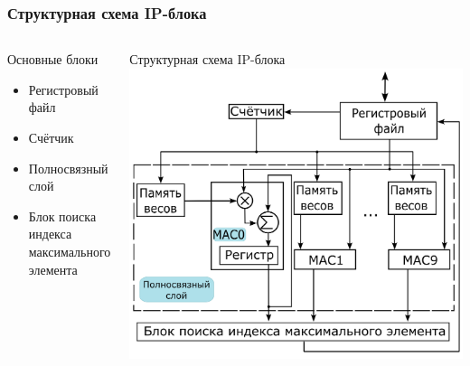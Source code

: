 \begin{frame}[t]
\frametitle{Структурная схема IP-блока}
\begin{columns}
    \begin{block}{\centering Основные блоки}                
        \begin{itemize}\small
            \item Регистровый файл
            \item Счётчик
            \item Полносвязный слой
            \item Блок поиска индекса максимального элемента        
        \end{itemize}
    \end{block}
     
    \begin{block}{\centering Структурная схема IP-блока}
        \vspace{3mm}
        \centering \includegraphics[height = 0.65\textheight]{pics/ip.png}
    \end{block}
\end{columns}


\end{frame}


